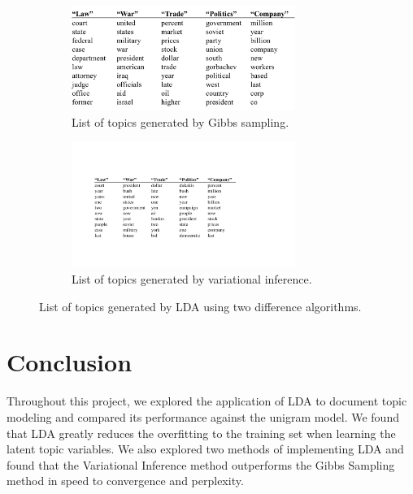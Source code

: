 \documentclass{article} %
\begin{document}
\begin{figure}
\begin{subfigure}{1\linewidth}
\centering
\includegraphics[width=0.8\textwidth]{topics_gs}
\caption{List of topics generated by Gibbs sampling.}
\vspace{1em} %
\end{subfigure}

\begin{subfigure}{1\linewidth}
\centering
 \includegraphics[width=0.8\textwidth]{topics_vi}
 \caption{List of topics generated by variational inference.}
\end{subfigure}
\caption{List of topics generated by LDA using two difference algorithms.}
\label{fig:topics_gs}
\end{figure}

\section{Conclusion}
Throughout this project, we explored the application of LDA to document topic modeling and compared its performance against the unigram model. We found that LDA greatly reduces the overfitting to the training set 
when learning the latent topic variables. We also explored two methods of implementing LDA and found that 
the Variational Inference method outperforms the Gibbs Sampling method in speed to convergence and perplexity. 
\end{document}
